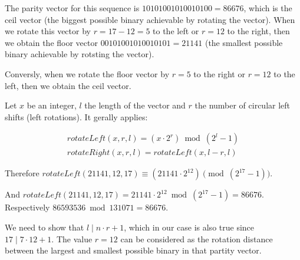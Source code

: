 \documentclass[12pt]{amsart}
\theoremstyle{definition}
\begin{document}
The parity vector for this sequence is $10101001010010100=86676$, which is the ceil vector (the biggest possible binary achievable by rotating the vector). When we rotate this vector by $r=17-12=5$ to the left or $r=12$ to the right, then we obtain the floor vector $00101001010010101=21141$ (the smallest possible binary achievable by rotsting the vector).

Conversly, when we rotate the floor vector by $r=5$ to the right or $r=12$ to the left, then we obtain the ceil vector.

Let $x$ be an integer, $l$ the length of the vector and $r$ the number of circular left shifts (left rotations). It gerally applies:

\[
\begin{array}{l}
rotateLeft(x,r,l)=(x\cdot2^r)\bmod{(2^l-1)}\\
rotateRight(x,r,l)=rotateLeft(x,l-r,l)
\end{array}
\]

Therefore $rotateLeft(21141,12,17)\equiv(21141\cdot2^{12})\pmod{(2^{17}-1)}$.
\par\noindent
And $rotateLeft(21141,12,17)=21141\cdot2^{12}\bmod{(2^{17}-1)}=86676$. Respectively $86593536\bmod{131071}=86676$.

We need to show that $l\mid n\cdot r+1$, which in our case is also true since $17\mid 7\cdot12+1$. The value $r=12$ can be considered as the rotation distance between the largest and smallest possible binary in that partity vector.

\vspace{1em}


\end{document}
